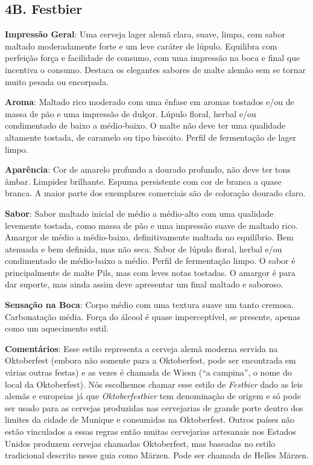 \subsection*{4B. Festbier}
\textbf{Impressão Geral}: Uma cerveja lager alemã clara, suave, limpa, com sabor maltado moderadamente forte e um leve caráter de lúpulo. Equilibra com perfeição força e facilidade de consumo, com uma impressão na boca e final que incentiva o consumo. Destaca os elegantes sabores de malte alemão sem se tornar muito pesada ou encorpada.

\textbf{Aroma}: Maltado rico moderado com uma ênfase em aromas tostados e/ou de massa de pão e uma impressão de dulçor. Lúpulo floral, herbal e/ou condimentado de baixo a médio-baixo. O malte não deve ter uma qualidade altamente tostada, de caramelo ou tipo biscoito. Perfil de fermentação de lager limpo.

\textbf{Aparência}: Cor de amarelo profundo a dourado profundo, não deve ter tons âmbar. Limpidez brilhante. Espuma persistente com cor de branca a quase branca. A maior parte dos exemplares comerciais são de coloração dourado claro.

\textbf{Sabor}: Sabor maltado inicial de médio a médio-alto com uma qualidade levemente tostada, como massa de pão e uma impressão suave de maltado rico. Amargor de médio a médio-baixo, definitivamente maltada no equilíbrio. Bem atenuada e bem definida, mas não seca. Sabor de lúpulo floral, herbal e/ou condimentado de médio-baixo a médio. Perfil de fermentação limpo. O sabor é principalmente de malte Pils, mas com leves notas tostadas. O amargor é para dar suporte, mas ainda assim deve apresentar um final maltado e saboroso.

\textbf{Sensação na Boca}: Corpo médio com uma textura suave um tanto cremosa. Carbonatação média. Força do álcool é quase imperceptível, se presente, apenas como um aquecimento sutil.

\textbf{Comentários}: Esse estilo representa a cerveja alemã moderna servida na Oktoberfest (embora não somente para a Oktoberfest, pode ser encontrada em várias outras festas) e as vezes é chamada de Wiesn (“a campina”, o nome do local da Oktoberfest). Nós escolhemos chamar esse estilo de \textit{Festbier} dado as leis alemãs e europeias já que \textit{Oktoberfestbier} tem denominação de origem e só pode ser usado para as cervejas produzidas nas cervejarias de grande porte dentro dos limites da cidade de Munique e consumidas na Oktoberfest. Outros países não estão vinculados a essas regras então muitas cervejarias artesanais nos Estados Unidos produzem cervejas chamadas Oktoberfest, mas baseadas no estilo tradicional descrito nesse guia como Märzen. Pode ser chamada de Helles Märzen.

